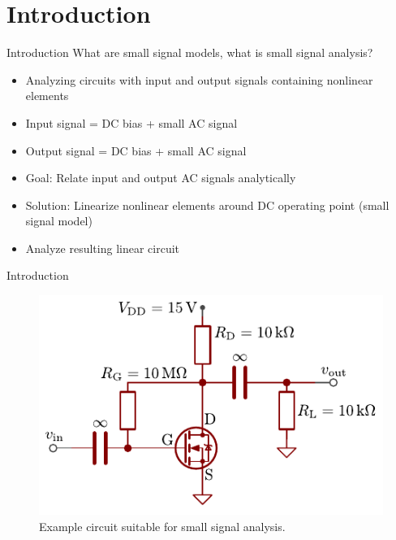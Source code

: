 \section{Introduction}
\begin{frame}{Introduction}
	What are small signal models, what is small signal analysis?
	\begin{itemize}
		\item Analyzing circuits with input and output signals containing nonlinear elements
		\item Input signal = DC bias + small AC signal
		\item Output signal = DC bias + small AC signal
		\item Goal: Relate input and output AC signals analytically 
		\item Solution: Linearize nonlinear elements around DC operating point (small signal model)
		\item Analyze resulting linear circuit
	\end{itemize}
\end{frame}

\begin{frame}{Introduction}
	\begin{figure}
		\centering
		\includegraphics{../assets/example_circuit.pdf}
		\caption{Example circuit suitable for small signal analysis.}
		\label{fig:example_circuit}
	\end{figure}
\end{frame}